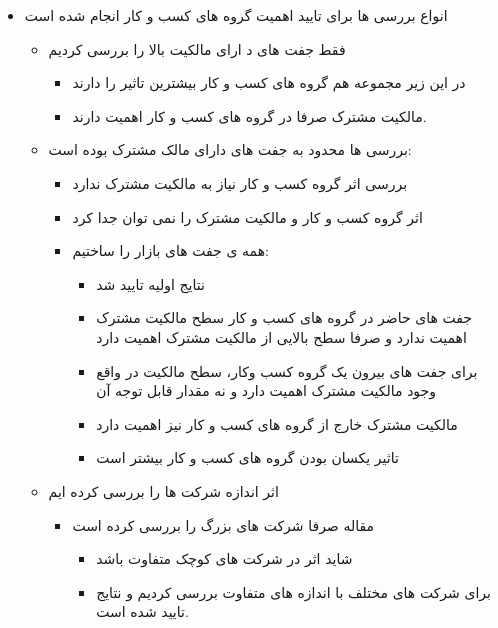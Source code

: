\documentclass[12pt, a4paper]{article}
\begin{document}
\begin{itemize}
\item 
انواع بررسی ها برای تایید اهمیت گروه های کسب و کار انجام شده است 
\begin{itemize}

\item
فقط جفت  های د ارای مالکیت بالا را بررسی کردیم
\begin{itemize}
\item 
در این زیر مجموعه هم گروه های کسب و کار بیشترین تاثیر را دارند 
\item
مالکیت مشترک صرفا در گروه های کسب و کار اهمیت دارند.

\end{itemize}
\item
بررسی ها محدود به جفت های دارای مالک مشترک بوده است:
\begin{itemize}
\item
بررسی اثر گروه کسب و کار نیاز به مالکیت مشترک ندارد
\item
اثر گروه کسب و کار و مالکیت مشترک را نمی توان جدا کرد
\item 
همه ی جفت های بازار را ساختیم:
\begin{itemize}
\item
نتایج اولیه تایید شد
\item 
جفت های حاضر در گروه های کسب و کار سطح مالکیت مشترک اهمیت ندارد و صرفا سطح بالایی از مالکیت مشترک اهمیت دارد
\item
برای جفت های بیرون یک گروه کسب وکار، سطح مالکیت در واقع وجود مالکیت مشترک اهمیت دارد و نه مقدار قابل توجه آن
\item
مالکیت مشترک خارج از گروه های کسب و کار نیز اهمیت دارد
\item
تاثیر یکسان بودن گروه های کسب و کار بیشتر است
\end{itemize}
\end{itemize}

\item
اثر اندازه شرکت ها را بررسی کرده ایم
\begin{itemize}
\item
مقاله 
صرفا شرکت های بزرگ را بررسی کرده است
\begin{itemize}
\item 
شاید اثر در شرکت های کوچک متفاوت باشد
\item
برای شرکت های مختلف با اندازه های متفاوت بررسی کردیم و نتایج تایید شده است.
\end{itemize}
\end{itemize}
\end{itemize}




\end{itemize}
\end{document}
